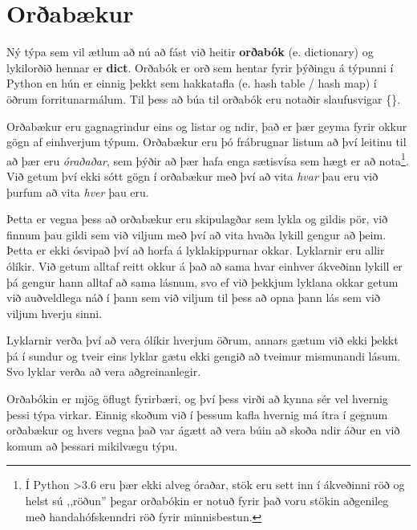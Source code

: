 
\chapter{Orðabækur}\label{k:orðabækur}
Ný týpa sem vil ætlum að nú að fást við heitir \textbf{orðabók} (e. dictionary)  og lykilorðið hennar er \textbf{dict}.
Orðabók er orð sem hentar fyrir þýðingu á týpunni í Python en hún er einnig þekkt sem hakkatafla (e. hash table / hash map) í öðrum forritunarmálum.
Til þess að búa til orðabók eru notaðir slaufusvigar \{\}.

Orðabækur eru gagnagrindur eins og listar og ndir, það er þær geyma fyrir okkur gögn af einhverjum týpum.
Orðabækur eru þó frábrugnar listum að því leitinu til að þær eru \textit{óraðaðar}, sem þýðir að þær hafa enga sætisvísa sem hægt er að nota\footnote{Í Python >3.6 eru þær ekki alveg óraðar, stök eru sett inn í ákveðinni röð og helst sú ,,röðun'' þegar orðabókin er notuð fyrir það voru stökin aðgenileg með handahófskenndri röð fyrir minnisbestun.}.
Við getum því ekki sótt gögn í orðabækur með því að vita \textit{hvar} þau eru við þurfum að vita \textit{hver} þau eru.

Þetta er vegna þess að orðabækur eru skipulagðar sem lykla og gildis pör, við finnum þau gildi sem við viljum með því að vita hvaða lykill gengur að þeim.
Þetta er ekki ósvipað því að horfa á lyklakippurnar okkar.
Lyklarnir eru allir ólíkir.
Við getum alltaf reitt okkur á það að sama hvar einhver ákveðinn lykill er þá gengur hann alltaf að sama lásnum, svo ef við þekkjum lyklana okkar getum við auðveldlega náð í þann sem við viljum til þess að opna þann lás sem við viljum hverju sinni.

Lyklarnir verða því að vera ólíkir hverjum öðrum, annars gætum við ekki þekkt þá í sundur og tveir eins lyklar gætu ekki gengið að tveimur mismunandi lásum.
Svo lyklar verða að vera aðgreinanlegir.

Orðabókin er mjög öflugt fyrirbæri, og því þess virði að kynna sér vel hvernig þessi týpa virkar.
Einnig skoðum við í þessum kafla hvernig má ítra í gegnum orðabækur og hvers vegna það var ágætt að vera búin að skoða ndir áður en við komum að þessari mikilvægu týpu.
